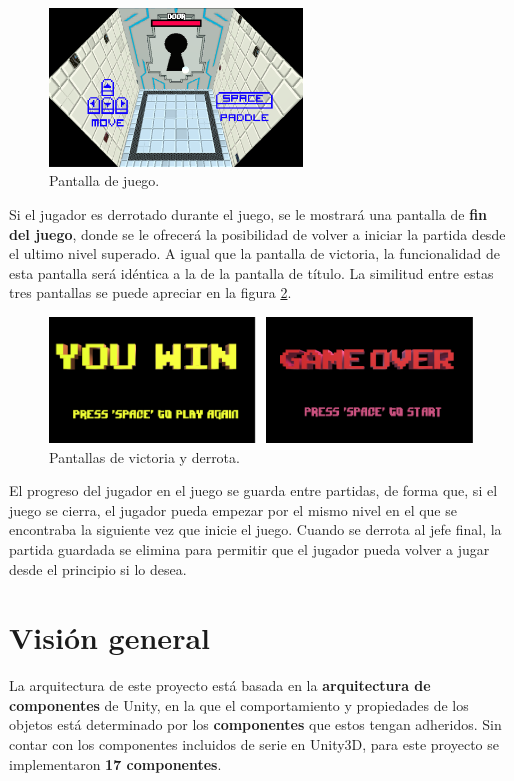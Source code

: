 \begin{figure}[h]
    \centering
    \includegraphics[width=0.6\textwidth]{images/estructura/descripcion/juego}
    \caption{Pantalla de juego.}
    \label{juego}
\end{figure}

Si el jugador es derrotado durante el juego, se le mostrará una pantalla de \textbf{fin del juego}, donde se le ofrecerá la posibilidad de volver a iniciar la partida desde el ultimo nivel superado. A igual que la pantalla de victoria, la funcionalidad de esta pantalla será idéntica a la de la pantalla de título. La similitud entre estas tres pantallas se puede apreciar en la figura \ref{win_lose}.

\begin{figure}[h]
    \centering
    \includegraphics[width=1\textwidth]{images/estructura/descripcion/win_lose}
    \caption{Pantallas de victoria y derrota.}
    \label{win_lose}
\end{figure}

El progreso del jugador en el juego se guarda entre partidas, de forma que, si el juego se cierra, el jugador pueda empezar por el mismo nivel en el que se encontraba la siguiente vez que inicie el juego. Cuando se derrota al jefe final, la partida guardada se elimina para permitir que el jugador pueda volver a jugar desde el principio si lo desea.

\section{Visión general}
La arquitectura de este proyecto está basada en la \textbf{arquitectura de componentes} de Unity, en la que el comportamiento y propiedades de los objetos está determinado por los \textbf{componentes} que estos tengan adheridos. Sin contar con los componentes incluidos de serie en Unity3D, para este proyecto se implementaron \textbf{17 componentes}.

